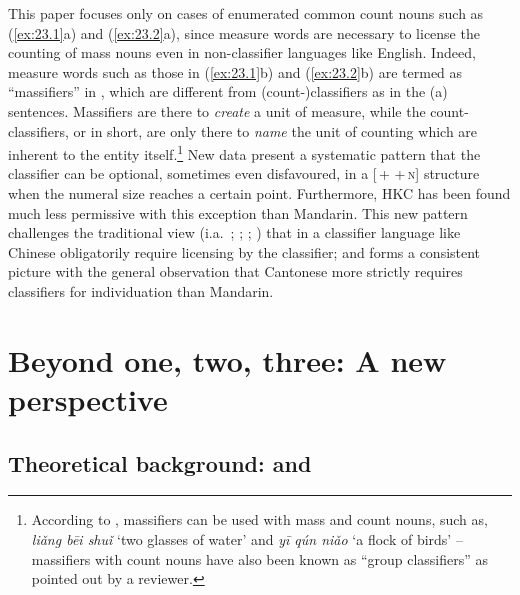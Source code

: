 \documentclass[output=paper]{langsci/langscibook}
\begin{document}
This paper focuses only on cases of enumerated common count nouns such as
(\ref{ex:23.1}a) and (\ref{ex:23.2}a), since measure words are
necessary to license the counting of mass nouns even in non-classifier
languages like English. Indeed, measure words such as those in
(\ref{ex:23.1}b) and (\ref{ex:23.2}b) are termed as
\enquote{massifiers} in \citet{ChengSybesma1998}, which are different from
(count-)classifiers as in the (a) sentences.  Massifiers are there to
\emph{create} a unit of measure, while the count-classifiers, or
 in short, are only there to \emph{name} the unit of counting
which are inherent to the entity itself.\footnote{According to
    \textcite{ChengSybesma1998}, massifiers can be used with mass and count
    nouns, such as, \emph{liǎng bēi shuǐ} \enquote*{two glasses of water} and
    \emph{yī qún niǎo} \enquote*{a flock of birds} -- massifiers with count
nouns have also been known as \enquote{group classifiers} as pointed out by a
reviewer.} New data present a systematic pattern that the
classifier can be optional, sometimes even disfavoured, in a
[\Num{}\,+\,\Clf{}\,+\,\textsc{n}] structure when the numeral size
reaches a certain point. Furthermore, \gls{HKC} has
been found much less permissive with this exception than Mandarin.
This new pattern challenges the traditional view (i.a.~\citealt{Krifka1995};
\citealt{Chierchia1998};
\citealt{ChengSybesma1999,ChengSybesma2005,ChengSybesma2012};
\citealt{Doetjes1996}) that  in a classifier
language like Chinese obligatorily require licensing by the
classifier; and forms a consistent picture with the general
observation that Cantonese more strictly requires classifiers for individuation
than Mandarin.

\section{Beyond one, two, three: A new perspective}

\subsection{Theoretical background: \citet{Krifka1995} and \citet{Chierchia1998}}
\end{document}
